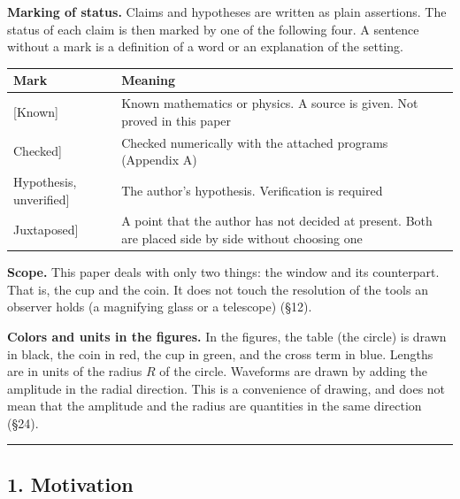 \documentclass[
  a4paper,
]{article}
\newcounter{none} %
\begin{document}
\textbf{Marking of status.} Claims and hypotheses are written as plain
assertions. The status of each claim is then marked by one of the
following four. A sentence without a mark is a definition of a word or
an explanation of the setting.

{\def\LTcaptype{none} %
\begin{longtable}[]{@{}
  >{\raggedright\arraybackslash}p{}
  >{\raggedright\arraybackslash}p{}@{}}
\toprule\noalign{}
\begin{minipage}[b]{\linewidth}\raggedright
Mark
\end{minipage} & \begin{minipage}[b]{\linewidth}\raggedright
Meaning
\end{minipage} \\
\midrule\noalign{}
\endhead
\bottomrule\noalign{}
\endlastfoot
{[}Known{]} & Known mathematics or physics. A source is given. Not
proved in this paper \\
{[}Checked{]} & Checked numerically with the attached programs (Appendix
A) \\
{[}Hypothesis, unverified{]} & The author's hypothesis. Verification is
required \\
{[}Juxtaposed{]} & A point that the author has not decided at present.
Both are placed side by side without choosing one \\
\end{longtable}
}

\textbf{Scope.} This paper deals with only two things: the window and
its counterpart. That is, the cup and the coin. It does not touch the
resolution of the tools an observer holds (a magnifying glass or a
telescope) (§12).

\textbf{Colors and units in the figures.} In the figures, the table (the
circle) is drawn in black, the coin in red, the cup in green, and the
cross term in blue. Lengths are in units of the radius \(R\) of the
circle. Waveforms are drawn by adding the amplitude in the radial
direction. This is a convenience of drawing, and does not mean that the
amplitude and the radius are quantities in the same direction (§24).

\begin{center}\rule{0.5\linewidth}{0.5pt}\end{center}

\subsection{1. Motivation}\label{motivation}
\end{document}
